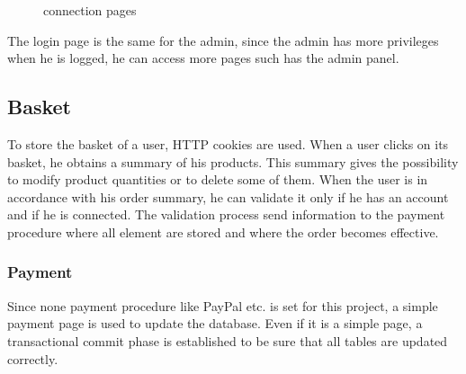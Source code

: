 \documentclass{article}
\begin{document}
\begin{figure}[h!]
    \caption{connection pages}%
    \label{fig:mineral}%
\end{figure}

The login page is the same for the admin, since the admin has more privileges when he is logged, he can access more pages such has the admin panel.

\subsection{Basket}
To store the basket of a user, HTTP cookies are used. When a user clicks on its basket, he obtains a summary of his products. This summary gives the possibility to modify product quantities or to delete some of them. When the user is in accordance with his order summary, he can validate it only if he has an account and if he is connected. The validation process send information to the payment procedure where all element are stored and where the order becomes effective.

\subsubsection{Payment}
Since none payment procedure like PayPal etc. is set for this project, a simple payment page is used to update the database. Even if it is a simple page, a transactional commit phase is established to be sure that all tables are updated correctly.
\end{document}
